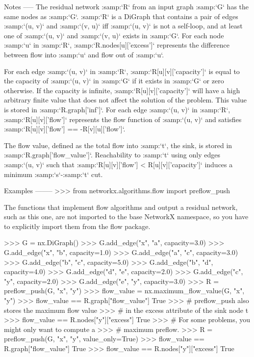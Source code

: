 \begin{DoxyVerb}
Notes
-----
The residual network :samp:`R` from an input graph :samp:`G` has the
same nodes as :samp:`G`. :samp:`R` is a DiGraph that contains a pair
of edges :samp:`(u, v)` and :samp:`(v, u)` iff :samp:`(u, v)` is not a
self-loop, and at least one of :samp:`(u, v)` and :samp:`(v, u)` exists
in :samp:`G`. For each node :samp:`u` in :samp:`R`,
:samp:`R.nodes[u]['excess']` represents the difference between flow into
:samp:`u` and flow out of :samp:`u`.

For each edge :samp:`(u, v)` in :samp:`R`, :samp:`R[u][v]['capacity']`
is equal to the capacity of :samp:`(u, v)` in :samp:`G` if it exists
in :samp:`G` or zero otherwise. If the capacity is infinite,
:samp:`R[u][v]['capacity']` will have a high arbitrary finite value
that does not affect the solution of the problem. This value is stored in
:samp:`R.graph['inf']`. For each edge :samp:`(u, v)` in :samp:`R`,
:samp:`R[u][v]['flow']` represents the flow function of :samp:`(u, v)` and
satisfies :samp:`R[u][v]['flow'] == -R[v][u]['flow']`.

The flow value, defined as the total flow into :samp:`t`, the sink, is
stored in :samp:`R.graph['flow_value']`. Reachability to :samp:`t` using
only edges :samp:`(u, v)` such that
:samp:`R[u][v]['flow'] < R[u][v]['capacity']` induces a minimum
:samp:`s`-:samp:`t` cut.

Examples
--------
>>> from networkx.algorithms.flow import preflow_push

The functions that implement flow algorithms and output a residual
network, such as this one, are not imported to the base NetworkX
namespace, so you have to explicitly import them from the flow package.

>>> G = nx.DiGraph()
>>> G.add_edge("x", "a", capacity=3.0)
>>> G.add_edge("x", "b", capacity=1.0)
>>> G.add_edge("a", "c", capacity=3.0)
>>> G.add_edge("b", "c", capacity=5.0)
>>> G.add_edge("b", "d", capacity=4.0)
>>> G.add_edge("d", "e", capacity=2.0)
>>> G.add_edge("c", "y", capacity=2.0)
>>> G.add_edge("e", "y", capacity=3.0)
>>> R = preflow_push(G, "x", "y")
>>> flow_value = nx.maximum_flow_value(G, "x", "y")
>>> flow_value == R.graph["flow_value"]
True
>>> # preflow_push also stores the maximum flow value
>>> # in the excess attribute of the sink node t
>>> flow_value == R.nodes["y"]["excess"]
True
>>> # For some problems, you might only want to compute a
>>> # maximum preflow.
>>> R = preflow_push(G, "x", "y", value_only=True)
>>> flow_value == R.graph["flow_value"]
True
>>> flow_value == R.nodes["y"]["excess"]
True\end{DoxyVerb}
 \mbox{\label{namespacenetworkx_1_1algorithms_1_1flow_1_1preflowpush_ac59f40377f257cd406e27ebcab0faef3}} 
